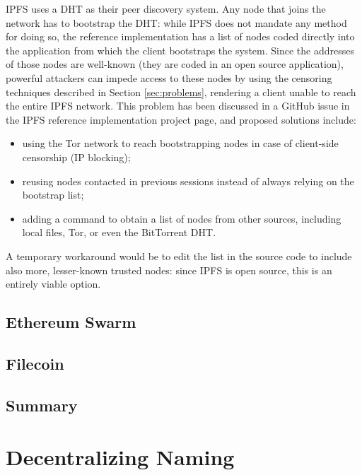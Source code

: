 \documentclass[mscthesis]{usiinfthesis}
\begin{document}
IPFS uses a DHT as their peer discovery system. Any node that joins the network has to bootstrap the DHT: while IPFS does not mandate any method for doing so, the reference implementation has a list of nodes coded directly into the application from which the client bootstraps the system. Since the addresses of those nodes are well-known (they are coded in an open source application), powerful attackers can impede access to these nodes by using the censoring techniques described in Section \ref{sec:problems}, rendering a client unable to reach the entire IPFS network. This problem has been discussed in a GitHub issue in the IPFS reference implementation project page, and proposed solutions include:
\begin{itemize}
	\item using the Tor network to reach bootstrapping nodes in case of client-side censorship (IP blocking);
	\item reusing nodes contacted in previous sessions instead of always relying on the bootstrap list;
	\item adding a command to obtain a list of nodes from other sources, including local files, Tor, or even the BitTorrent DHT.
\end{itemize}
A temporary workaround would be to edit the list in the source code to include also more, lesser-known trusted nodes: since IPFS is open source, this is an entirely viable option.

\section{Ethereum Swarm}\label{proj:swarm}



\section{Filecoin}\label{proj:filecoin}

\section{Summary}


\chapter{Decentralizing Naming}\label{ch:naming}
\end{document}
